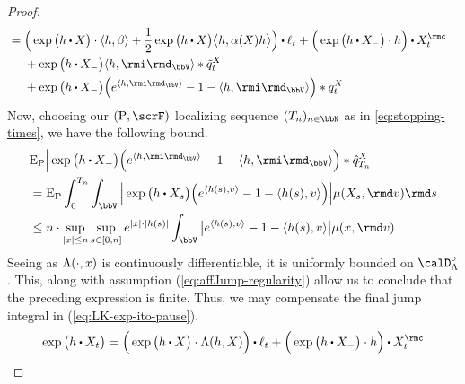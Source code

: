 \begin{proof}
\begin{align}
    \label{eq:LK-exp-ito-pause}
    &= \begin{aligned}[t]
      &\Big(\exp\big( \twistFunc \shortInt \X \big) \cdot \prj{\twistFunc}{\affDrift} + \frac12 \exp\big( \twistFunc \shortInt \X \big) \bprj{\twistFunc}{\affDiff(\X)\twistFunc} \Big) \shortInt \leb_t + \Big( \exp\big( \twistFunc \shortInt \X_- \big) \cdot \twistFunc \Big) \shortInt \X^\rmc_t \\
      &+ \exp\big( \twistFunc \shortInt \X_- \big) \prj{\twistFunc}{\id_\vecSpace} \ast \compensate{\jumpMeas^\X}_t \\
      &+ \exp\big(\twistFunc\shortInt\X_-\big) \Big( e^{\prj{\twistFunc}{\id_\vecSpace}} - 1 - \prj{\twistFunc}{\id_\vecSpace} \Big) \ast \jumpMeas^\X_t
    \end{aligned} 
  \end{align}
  Now, choosing our $(\Prb, \scrF)$ localizing sequence $(T_n)_{n\in\bbN}$ as in \ref{eq:stopping-times}, we have the following bound.
  \begin{align*}
    &\Exp_\Prb \Big| \exp\big(\twistFunc \shortInt \X_- \big) \Big(e^\prj{\twistFunc}{\id_\vecSpace} - 1 - \prj{\twistFunc}{\id_\vecSpace} \Big) \ast \predproj{\jumpMeas^\X}_{T_n} \Big| \\
    &= \Exp_\Prb \int_0^{T_n} \int_\vecSpace \Big| \exp\big(\twistFunc \shortInt \X_s \big) \Big( e^\prj{\twistFunc(s)}{\markVar} - 1 - \prj{\twistFunc(s)}{\markVar} \Big) \Big| \affJump(\X_s, \rmd\markVar) \rmd s \\
    &\leq n \cdot \sup_{|\stateVar| \leq n} \sup_{s \in [0,n]} e^{|\stateVar|\cdot|\twistFunc(s)|} \int_\vecSpace \big| e^\prj{\twistFunc(s)}{\markVar} - 1 - \prj{\twistFunc(s)}{\markVar} \big| \affJump(\stateVar, \rmd\markVar) 
  \end{align*}
  Seeing as $\Lambda(\cdot, x)$ is continuously differentiable, it is uniformly bounded on $\odeSpace^\circ$.
  This, along with assumption (\ref{eq:affJump-regularity}) allow us to conclude that the preceding expression is finite.
  Thus, we may compensate the final jump integral in (\ref{eq:LK-exp-ito-pause}).
  \begin{equation}
    \label{eq:jump-diffusion-exponentially-special}
    \exp\big( \twistFunc \shortInt \X_t \big) 
    = \begin{aligned}[t]
      &\Big(\exp\big( \twistFunc \shortInt \X \big) \cdot \ode(\twistFunc, \X) \Big) \shortInt \leb_t + \Big( \exp\big( \twistFunc \shortInt \X_- \big) \cdot \twistFunc \Big) \shortInt \X^\rmc_t \\

\end{aligned}
\end{equation}
\end{proof}
